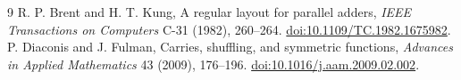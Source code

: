 \documentclass[11pt,a4paper]{article}
\theoremstyle{definition}\newtheorem{definition}[theorem]{Definition}
\begin{document}
\begin{thebibliography}{9}
 R. P. Brent and H. T. Kung,
A regular layout for parallel adders,
\emph{IEEE Transactions on Computers} C-31 (1982), 260--264.
\href{https://doi.org/10.1109/TC.1982.1675982}{doi:10.1109/TC.1982.1675982}.
 P. Diaconis and J. Fulman,
Carries, shuffling, and symmetric functions,
\emph{Advances in Applied Mathematics} 43 (2009), 176--196.
\href{https://doi.org/10.1016/j.aam.2009.02.002}{doi:10.1016/j.aam.2009.02.002}.
\end{thebibliography}
\end{document}
